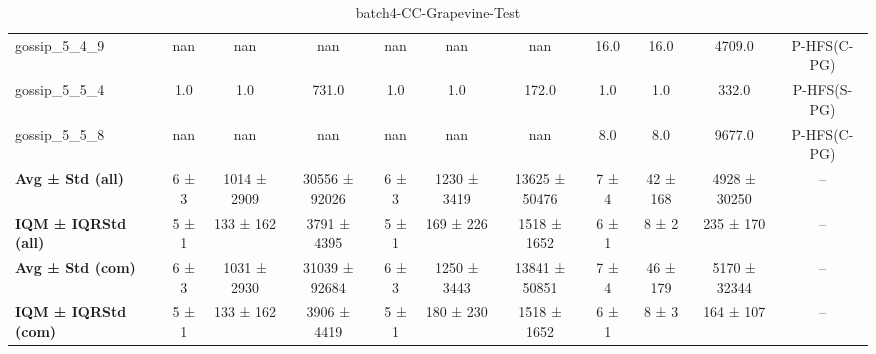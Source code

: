 \begin{table}[!ht]
\begin{tabular}{l|ccc|ccc|cccc}
gossip\_5\_4\_9 & nan & nan & nan & nan & nan & nan & 16.0 & 16.0 & 4709.0 & P-HFS(C-PG) \\
gossip\_5\_5\_4 & 1.0 & 1.0 & 731.0 & 1.0 & 1.0 & 172.0 & 1.0 & 1.0 & 332.0 & P-HFS(S-PG) \\
gossip\_5\_5\_8 & nan & nan & nan & nan & nan & nan & 8.0 & 8.0 & 9677.0 & P-HFS(C-PG) \\
\hline
\textbf{Avg ± Std (all)} & 6 ± 3 & 1014 ± 2909 & 30556 ± 92026 & 6 ± 3 & 1230 ± 3419 & 13625 ± 50476 & 7 ± 4 & 42 ± 168 & 4928 ± 30250 & -- \\
\textbf{IQM ± IQRStd (all)} & 5 ± 1 & 133 ± 162 & 3791 ± 4395 & 5 ± 1 & 169 ± 226 & 1518 ± 1652 & 6 ± 1 & 8 ± 2 & 235 ± 170 & -- \\
\textbf{Avg ± Std (com)} & 6 ± 3 & 1031 ± 2930 & 31039 ± 92684 & 6 ± 3 & 1250 ± 3443 & 13841 ± 50851 & 7 ± 4 & 46 ± 179 & 5170 ± 32344 & -- \\
\textbf{IQM ± IQRStd (com)} & 5 ± 1 & 133 ± 162 & 3906 ± 4419 & 5 ± 1 & 180 ± 230 & 1518 ± 1652 & 6 ± 1 & 8 ± 3 & 164 ± 107 & -- \\
\end{tabular}
\caption{batch4-CC-Grapevine-Test}
\label{tab:batch4_CC-Grapevine_comparison_test}
\end{table}
